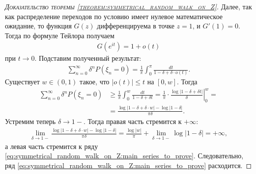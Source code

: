 \documentclass[../main.tex]{subfiles}
\begin{document}
\begin{proof}[\normalfont\textsc{Доказательство теоремы \ref{theorem:symmetrical_random_walk_on_Z}}]
 Далее, так как распределение переходов по условию имеет нулевое математическое ожидание, то функция $ G(z) $ дифференцируема в точке $ z = 1 $, и $ G'(1) = 0 $. Тогда по формуле Тейлора получаем
 \begin{align*}
  G(e^{it}) = 1 + o(t)
 \end{align*} при $ t \to 0 $. Подставим полученный результат:
 \begin{align*}
  \sum_{n=0}^{\infty}\delta^{n}P(\xi_n=0) = \frac{1}{\pi} \int_{0}^{\pi} \frac{dt}{1 - \delta + \delta \cdot o(t)}.
 \end{align*} Существует $ w \in (0, 1) $ такое, что  $ \left|o(t) \right| \leqslant t $  на $ [0,w] $. Тогда
  \begin{align*}
   \sum_{n=0}^{\infty}\delta^{n}P(\xi_n=0) &\geqslant \frac{1}{\pi}\int_{0}^{w} \frac{dt}{1 - \delta + \delta t} = \left. \frac{1}{\pi} \cdot \frac{\log \left| 1 - \delta + \delta t \right|}{\delta} \right|_0^{w} = \\
    &= \frac{\log \left| 1 - \delta + \delta \cdot w \right| - \log \left| 1 - \delta \right|}{\pi \delta}.
 \end{align*} Устремим теперь $ \delta \to 1- $.  Тогда правая часть стремится к $ +\infty $:
 \begin{align*}
  \lim_{\delta \to 1-} \frac{\log \left| 1 - \delta + \delta \cdot w \right| - \log \left| 1 - \delta \right|}{\pi \delta} = \frac{\log \left| w \right|}{\pi} + \lim_{\delta \to 1-}  \log \left| 1 - \delta \right| = +\infty,
 \end{align*} а левая часть стремится к ряду \eqref{eq:symmetrical_random_walk_on_Z:main_series_to_prove}. Следовательно, ряд \eqref{eq:symmetrical_random_walk_on_Z:main_series_to_prove} расходится.
 \end{proof}
\end{document}
